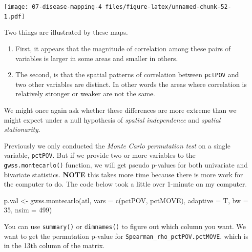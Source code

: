 \documentclass[
]{book}
\newenvironment{Shaded}{\begin{snugshade}}{\end{snugshade}}
\newcommand{\AttributeTok}[1]{\textcolor[rgb]{0.77,0.63,0.00}{#1}}
\newcommand{\DecValTok}[1]{\textcolor[rgb]{0.00,0.00,0.81}{#1}}
\newcommand{\FunctionTok}[1]{\textcolor[rgb]{0.00,0.00,0.00}{#1}}
\newcommand{\NormalTok}[1]{#1}
\newcommand{\OtherTok}[1]{\textcolor[rgb]{0.56,0.35,0.01}{#1}}
\newcommand{\StringTok}[1]{\textcolor[rgb]{0.31,0.60,0.02}{#1}}
\providecommand{\tightlist}{%
  \setlength{\itemsep}{0pt}\setlength{\parskip}{0pt}}
\begin{document}
\texttt{[image: 07-disease-mapping-4\_files/figure-latex/unnamed-chunk-52-1.pdf]}

Two things are illustrated by these maps.

\begin{enumerate}
\def\labelenumi{\arabic{enumi}.}
\tightlist
\item
  First, it appears that the magnitude of correlation among these pairs of variables is larger in some areas and smaller in others.
\item
  The second, is that the spatial patterns of correlation between \texttt{pctPOV} and two other variables are distinct. In other words the areas where correlation is relatively stronger or weaker are not the same.
\end{enumerate}

We might once again ask whether these differences are more extreme than we might expect under a null hypothesis of \emph{spatial independence} and \emph{spatial stationarity}.

Previously we only conducted the \emph{Monte Carlo permutation test} on a single variable, \texttt{pctPOV}. But if we provide two or more variables to the \texttt{gwss.montecarlo()} function, we will get pseudo p-values for both univariate and bivariate statistics. \textbf{NOTE} this takes more time because there is more work for the computer to do. The code below took a little over 1-minute on my computer.

\begin{Shaded}
\begin{Highlighting}[]
\NormalTok{p.val }\OtherTok{\textless{}{-}} \FunctionTok{gwss.montecarlo}\NormalTok{(atl, }\AttributeTok{vars =} \FunctionTok{c}\NormalTok{(}\StringTok{\textquotesingle{}pctPOV\textquotesingle{}}\NormalTok{, }\StringTok{\textquotesingle{}pctMOVE\textquotesingle{}}\NormalTok{), }
                         \AttributeTok{adaptive =}\NormalTok{ T,}
                         \AttributeTok{bw =} \DecValTok{35}\NormalTok{,}
                         \AttributeTok{nsim =} \DecValTok{499}\NormalTok{)}
\end{Highlighting}
\end{Shaded}

You can use \texttt{summary()} or \texttt{dimnames()} to figure out which column you want. We want to get the permutation p-value for \texttt{Spearman\_rho\_pctPOV.pctMOVE}, which is in the 13th column of the matrix.
\end{document}

